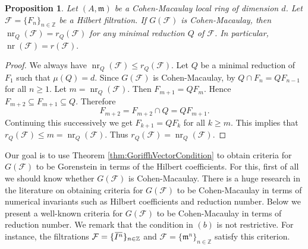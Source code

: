 \documentclass[12pt]{amsart}
\newtheorem{prop}[thm]{Proposition}
\theoremstyle{definition}
\theoremstyle{remark}
\numberwithin{equation}{section}
\newcommand{\bbZ}{\ensuremath{\mathbb Z}}
\newcommand{\m}{{\mathfrak m}}
\DeclareMathOperator{\nr}{{nr}}
\newcommand{\FF}{\mathcal{F}}
\newcommand{\ol}[1]{\mkern 1.5mu\overline{\mkern-1.5mu#1\mkern-1.5mu}\mkern 1.5mu} %
\begin{document}
\begin{prop}\label{lemma:nr=r}
Let $(A,\m)$ be a Cohen-Macaulay local ring of dimension $d$. 
Let $\mathcal{F}=\{F_n\}_{n\in \mathbb{Z}}$ be a Hilbert filtration. 
If $G(\mathcal{F})$ is Cohen-Macaulay, 
then $\nr_Q(\mathcal{F})= r_Q(\mathcal{F})$ for any minimal reduction $Q$ of $\FF$. 
In particular, $  \nr(\FF) = r(\FF).$
\end{prop}

\begin{proof}
We always have $\nr_Q(\mathcal{F}) \leq r_Q(\mathcal{F})$.  
Let $Q$ be a minimal reduction of $F_1$ such that $\mu(Q)=d$. 
Since $G(\FF)$ is Cohen-Macaulay, by \cite[Proposition 3.5]{HucMar} 
$Q \cap F_n=QF_{n-1}$ for all $n\geq 1$.  
Let $m=\nr_Q(\mathcal{F}).$ Then $F_{m+1}=QF_{m}$. 
Hence $F_{m+2} \subseteq F_{m+1} \subseteq Q$. 
Therefore
\[
F_{m+2} = F_{m+2} \cap Q = QF_{m+1}.
\]
Continuing this successively we get ${F_{k+1}} = {QF_k}$ for all $k\geq m$. 
This implies that $r_Q(\mathcal{F})\leq m=\nr_Q(\mathcal{F})$. 
Thus $r_Q(\mathcal{F})=\nr_Q(\mathcal{F})$. 
\end{proof}

\par     
Our goal is to use Theorem \ref{thm:GoriffhVectorCondition}
to obtain criteria for $G(\FF)$ to be Gorenstein in terms of the Hilbert coefficients. For this, first of all we should know whether  $G(\FF)$ is Cohen-Macaulay. There is a huge research in the literature on obtaining criteria for $G(\FF)$
    to be Cohen-Macaulay in terms of numerical invariants such as Hilbert coefficients and reduction number. Below we present a well-known criteria for $G(\FF)$ to be Cohen-Macaulay in terms of reduction number. We remark that the condition in $(b)$ is not restrictive. For instance, the filtrations $\FF=\{\ol{I^n}\}_{n \in \bbZ}$ and $\FF=\{\m^n\}_{n \in \bbZ}$ satisfy this criterion.
\end{document}
